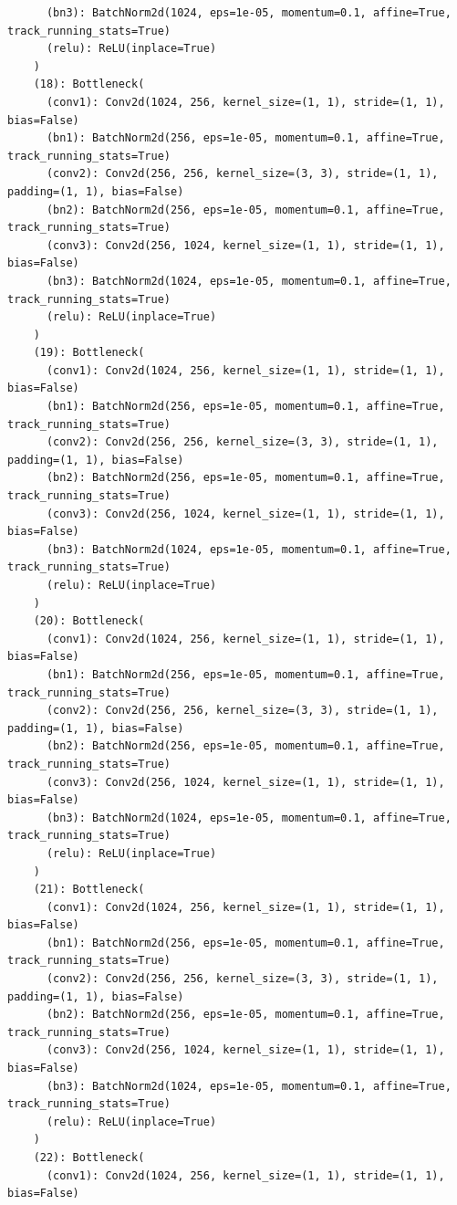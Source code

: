 \documentclass{article}
\begin{document}
\begin{verbatim}
      (bn3): BatchNorm2d(1024, eps=1e-05, momentum=0.1, affine=True, track_running_stats=True)
      (relu): ReLU(inplace=True)
    )
    (18): Bottleneck(
      (conv1): Conv2d(1024, 256, kernel_size=(1, 1), stride=(1, 1), bias=False)
      (bn1): BatchNorm2d(256, eps=1e-05, momentum=0.1, affine=True, track_running_stats=True)
      (conv2): Conv2d(256, 256, kernel_size=(3, 3), stride=(1, 1), padding=(1, 1), bias=False)
      (bn2): BatchNorm2d(256, eps=1e-05, momentum=0.1, affine=True, track_running_stats=True)
      (conv3): Conv2d(256, 1024, kernel_size=(1, 1), stride=(1, 1), bias=False)
      (bn3): BatchNorm2d(1024, eps=1e-05, momentum=0.1, affine=True, track_running_stats=True)
      (relu): ReLU(inplace=True)
    )
    (19): Bottleneck(
      (conv1): Conv2d(1024, 256, kernel_size=(1, 1), stride=(1, 1), bias=False)
      (bn1): BatchNorm2d(256, eps=1e-05, momentum=0.1, affine=True, track_running_stats=True)
      (conv2): Conv2d(256, 256, kernel_size=(3, 3), stride=(1, 1), padding=(1, 1), bias=False)
      (bn2): BatchNorm2d(256, eps=1e-05, momentum=0.1, affine=True, track_running_stats=True)
      (conv3): Conv2d(256, 1024, kernel_size=(1, 1), stride=(1, 1), bias=False)
      (bn3): BatchNorm2d(1024, eps=1e-05, momentum=0.1, affine=True, track_running_stats=True)
      (relu): ReLU(inplace=True)
    )
    (20): Bottleneck(
      (conv1): Conv2d(1024, 256, kernel_size=(1, 1), stride=(1, 1), bias=False)
      (bn1): BatchNorm2d(256, eps=1e-05, momentum=0.1, affine=True, track_running_stats=True)
      (conv2): Conv2d(256, 256, kernel_size=(3, 3), stride=(1, 1), padding=(1, 1), bias=False)
      (bn2): BatchNorm2d(256, eps=1e-05, momentum=0.1, affine=True, track_running_stats=True)
      (conv3): Conv2d(256, 1024, kernel_size=(1, 1), stride=(1, 1), bias=False)
      (bn3): BatchNorm2d(1024, eps=1e-05, momentum=0.1, affine=True, track_running_stats=True)
      (relu): ReLU(inplace=True)
    )
    (21): Bottleneck(
      (conv1): Conv2d(1024, 256, kernel_size=(1, 1), stride=(1, 1), bias=False)
      (bn1): BatchNorm2d(256, eps=1e-05, momentum=0.1, affine=True, track_running_stats=True)
      (conv2): Conv2d(256, 256, kernel_size=(3, 3), stride=(1, 1), padding=(1, 1), bias=False)
      (bn2): BatchNorm2d(256, eps=1e-05, momentum=0.1, affine=True, track_running_stats=True)
      (conv3): Conv2d(256, 1024, kernel_size=(1, 1), stride=(1, 1), bias=False)
      (bn3): BatchNorm2d(1024, eps=1e-05, momentum=0.1, affine=True, track_running_stats=True)
      (relu): ReLU(inplace=True)
    )
    (22): Bottleneck(
      (conv1): Conv2d(1024, 256, kernel_size=(1, 1), stride=(1, 1), bias=False)

\end{verbatim}
\end{document}
